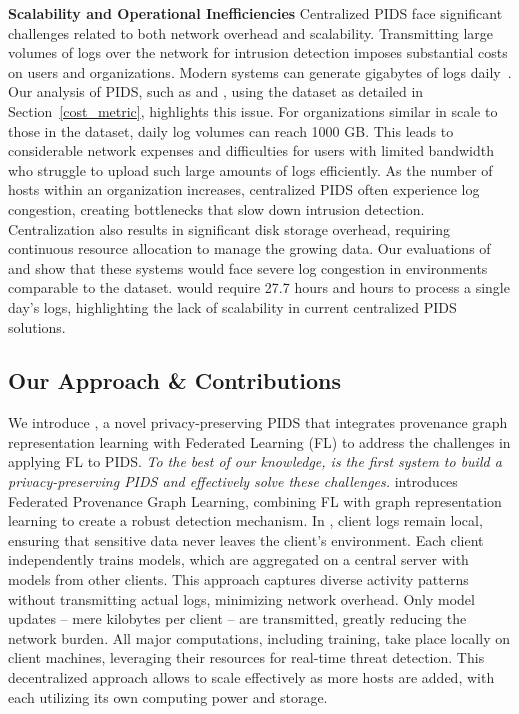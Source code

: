     
\smallskip
\noindent
\textbf{Scalability and Operational Inefficiencies}  Centralized PIDS face significant challenges related to both network overhead and scalability. Transmitting large volumes of logs over the network for intrusion detection imposes substantial costs on users and organizations. Modern systems can generate gigabytes of logs daily~\cite{inam2023sok,hossain+depend}. Our analysis of PIDS, such as \flash and \kairos, using the \optc dataset as detailed in Section~\ref{cost_metric}, highlights this issue. For organizations similar in scale to those in the \optc dataset, daily log volumes can reach 1000 GB. This leads to considerable network expenses and difficulties for users with limited bandwidth who struggle to upload such large amounts of logs efficiently. As the number of hosts within an organization increases, centralized PIDS often experience log congestion, creating bottlenecks that slow down intrusion detection. Centralization also results in significant disk storage overhead, requiring continuous resource allocation to manage the growing data. Our evaluations of \flash and \kairos show that these systems would face severe log congestion in environments comparable to the \optc dataset. \flash would require 27.7 hours and  hours to process a single day's logs, highlighting the lack of scalability in current centralized PIDS solutions.


\subsection{Our Approach \& Contributions}

We introduce \Sys, a novel privacy-preserving PIDS that integrates provenance graph representation learning with Federated Learning (FL) to address the challenges in applying FL to PIDS. {\it To the best of our knowledge, \Sys is the first system to build a privacy-preserving PIDS and effectively solve these challenges.} \Sys introduces Federated Provenance Graph Learning, combining FL with graph representation learning to create a robust detection mechanism. In \Sys, client logs remain local, ensuring that sensitive data never leaves the client's environment. Each client independently trains \gnnshort models, which are aggregated on a central server with models from other clients. This approach captures diverse activity patterns without transmitting actual logs, minimizing network overhead. Only model updates -- mere kilobytes per client -- are transmitted, greatly reducing the network burden. All major computations, including training, take place locally on client machines, leveraging their resources for real-time threat detection. This decentralized approach allows \Sys to scale effectively as more hosts are added, with each utilizing its own computing power and storage.


